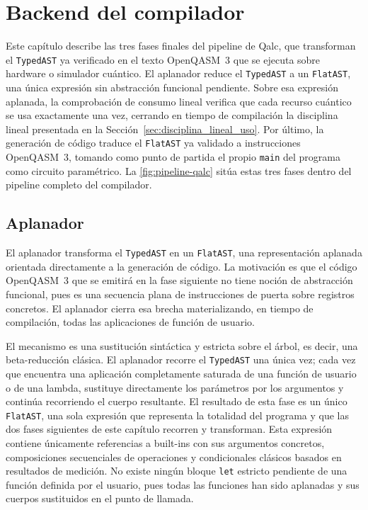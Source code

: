 \chapter{Backend del compilador}
\label{ch:backend}

Este capítulo describe las tres fases finales del pipeline de Qalc, que transforman el \lstinline|TypedAST| ya verificado en el texto OpenQASM~3 que se ejecuta sobre hardware o simulador cuántico. El aplanador reduce el \lstinline|TypedAST| a un \lstinline|FlatAST|, una única expresión sin abstracción funcional pendiente. Sobre esa expresión aplanada, la comprobación de consumo lineal verifica que cada recurso cuántico se usa exactamente una vez, cerrando en tiempo de compilación la disciplina lineal presentada en la Sección~\ref{sec:disciplina_lineal_uso}. Por último, la generación de código traduce el \lstinline|FlatAST| ya validado a instrucciones OpenQASM~3, tomando como punto de partida el propio \lstinline|main| del programa como circuito paramétrico. La \autoref{fig:pipeline-qalc} sitúa estas tres fases dentro del pipeline completo del compilador.

\section{Aplanador}
\label{sec:inliner}

El aplanador transforma el \lstinline|TypedAST| en un \lstinline|FlatAST|, una representación aplanada orientada directamente a la generación de código. La motivación es que el código OpenQASM~3 que se emitirá en la fase siguiente no tiene noción de abstracción funcional, pues es una secuencia plana de instrucciones de puerta sobre registros concretos. El aplanador cierra esa brecha materializando, en tiempo de compilación, todas las aplicaciones de función de usuario.

El mecanismo es una sustitución sintáctica y estricta sobre el árbol, es decir, una beta-reducción clásica. El aplanador recorre el \lstinline|TypedAST| una única vez; cada vez que encuentra una aplicación completamente saturada de una función de usuario o de una lambda, sustituye directamente los parámetros por los argumentos y continúa recorriendo el cuerpo resultante. El resultado de esta fase es un único \lstinline|FlatAST|, una sola expresión que representa la totalidad del programa y que las dos fases siguientes de este capítulo recorren y transforman. Esta expresión contiene únicamente referencias a built-ins con sus argumentos concretos, composiciones secuenciales de operaciones y condicionales clásicos basados en resultados de medición. No existe ningún bloque \lstinline|let| estricto pendiente de una función definida por el usuario, pues todas las funciones han sido aplanadas y sus cuerpos sustituidos en el punto de llamada.

